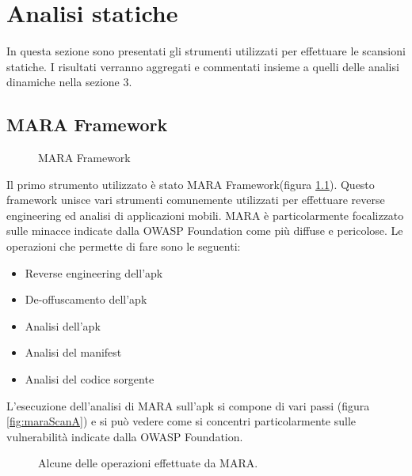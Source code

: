 \chapter{Analisi statiche}
In questa sezione sono presentati gli strumenti utilizzati per effettuare le scansioni statiche. I risultati verranno aggregati e commentati insieme a quelli delle analisi dinamiche nella sezione $3$.


\section{MARA Framework}

\begin{figure}[h]
	\centering 
	\caption{MARA Framework}
	\label{fig:mara} 
\end{figure}

Il primo strumento utilizzato è stato \ac{MARA} Framework(figura \ref{fig:mara})\cite{MARA}. Questo framework unisce vari strumenti comunemente utilizzati per effettuare reverse engineering ed analisi di applicazioni mobili. MARA è particolarmente focalizzato sulle minacce indicate dalla OWASP Foundation\cite{OWASP} come più diffuse e pericolose.
Le operazioni che permette di fare sono le seguenti:
\begin{itemize}
	\item Reverse engineering dell'apk
	\item De-offuscamento dell'apk
	\item Analisi dell'apk
	\item Analisi del manifest
	\item Analisi del codice sorgente
\end{itemize}

L'esecuzione dell'analisi di MARA sull'apk si compone di vari passi (figura \ref{fig:maraScanA}) e si può vedere come si concentri particolarmente sulle vulnerabilità indicate dalla OWASP Foundation.
\begin{figure}[h]
	\centering
	\caption{Alcune delle operazioni effettuate da MARA.}
\end{figure}

